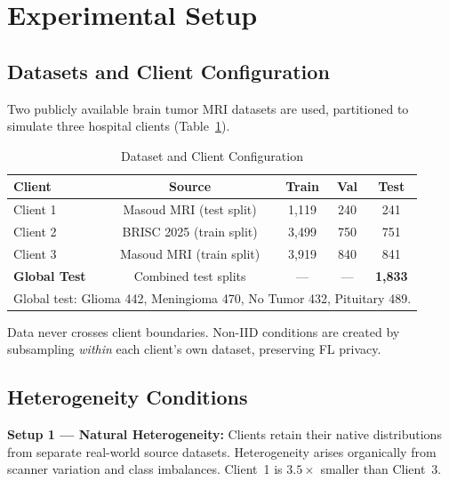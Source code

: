 \documentclass[conference]{IEEEtran}
\begin{document}
\section{Experimental Setup}
\label{sec:setup}

\subsection{Datasets and Client Configuration}
Two publicly available brain tumor MRI datasets are used, partitioned to
simulate three hospital clients (Table~\ref{tab:clients}).

\begin{table}[htbp]
\caption{Dataset and Client Configuration}
\label{tab:clients}
\begin{center}
\begin{tabular}{lcccc}
\hline
\textbf{Client} & \textbf{Source} & \textbf{Train} & \textbf{Val} &
\textbf{Test}\\
\hline
Client 1 & Masoud MRI \cite{masoud} (test split)  & 1,119 & 240 & 241\\
Client 2 & BRISC 2025 \cite{brisc} (train split)  & 3,499 & 750 & 751\\
Client 3 & Masoud MRI \cite{masoud} (train split) & 3,919 & 840 & 841\\
\hline
\textbf{Global Test} & Combined test splits & --- & --- & \textbf{1,833}\\
\hline
\multicolumn{5}{l}{\small Global test: Glioma 442, Meningioma 470, No Tumor
432, Pituitary 489.}
\end{tabular}
\end{center}
\end{table}

Data never crosses client boundaries. Non-IID conditions are created by
subsampling \emph{within} each client's own dataset, preserving FL privacy.

\subsection{Heterogeneity Conditions}

\textbf{Setup 1 --- Natural Heterogeneity:} Clients retain their native
distributions from separate real-world source datasets. Heterogeneity arises
organically from scanner variation and class imbalances. Client~1 is
$3.5\times$ smaller than Client~3.
\end{document}

